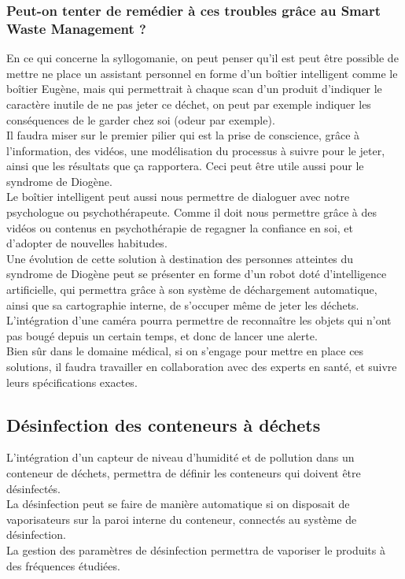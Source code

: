 \documentclass[a4paper,12pt]{report}
\begin{document}
\subsubsection*{Peut-on tenter de remédier à ces troubles grâce au Smart Waste Management ?}
En ce qui concerne la syllogomanie, on peut penser qu'il est peut être possible de mettre ne place un assistant personnel en forme d'un boîtier intelligent comme le boîtier Eugène, mais qui permettrait à chaque scan d'un produit d'indiquer le caractère inutile de ne pas jeter ce déchet, on peut par exemple indiquer les conséquences de le garder chez soi (odeur par exemple).\\
Il faudra miser sur le premier pilier qui est la prise de conscience, grâce à l'information, des vidéos, une modélisation du processus à suivre pour le jeter, ainsi que les résultats que ça rapportera. Ceci peut être utile aussi pour le syndrome de Diogène.\\
Le boîtier intelligent peut aussi nous permettre de dialoguer avec notre psychologue ou psychothérapeute. Comme il doit nous permettre grâce à des vidéos ou contenus en psychothérapie de regagner la confiance en soi, et d'adopter de nouvelles habitudes.\\
Une évolution de cette solution à destination des personnes atteintes du syndrome de Diogène peut se présenter en forme d'un robot doté d'intelligence artificielle, qui permettra grâce à son système de déchargement automatique, ainsi que sa cartographie interne, de s'occuper même de jeter les déchets.\\
L'intégration d'une caméra pourra permettre de reconnaître les objets qui n'ont pas bougé depuis un certain temps, et donc de lancer une alerte.\\
Bien sûr dans le domaine médical, si on s'engage pour mettre en place ces solutions, il faudra travailler en collaboration avec des experts en santé, et suivre leurs spécifications exactes.

\subsection{Désinfection des conteneurs à déchets}
L'intégration d'un capteur de niveau d'humidité et de pollution dans un conteneur de déchets, permettra de définir les conteneurs qui doivent être désinfectés.\\
La désinfection peut se faire de manière automatique si on disposait de vaporisateurs sur la paroi interne du conteneur, connectés au système de désinfection.\\
La gestion des paramètres de désinfection permettra de vaporiser le produits à des fréquences étudiées.
\end{document}
